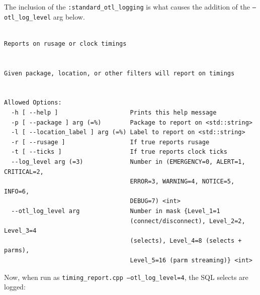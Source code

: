 \documentclass[11pt]{article}
\begin{document}
   The inclusion of the \texttt{:standard\_otl\_logging} is what causes the
   addition of the \texttt{--otl\_log\_level} arg below.


\lstset{language=Ruby}
\begin{lstlisting}

Reports on rusage or clock timings

 
Given package, location, or other filters will report on timings


Allowed Options:
  -h [ --help ]                    Prints this help message
  -p [ --package ] arg (=%)        Package to report on <std::string>
  -l [ --location_label ] arg (=%) Label to report on <std::string>
  -r [ --rusage ]                  If true reports rusage
  -t [ --ticks ]                   If true reports clock ticks
  --log_level arg (=3)             Number in (EMERGENCY=0, ALERT=1, CRITICAL=2,
                                   ERROR=3, WARNING=4, NOTICE=5, INFO=6, 
                                   DEBUG=7) <int>
  --otl_log_level arg              Number in mask {Level_1=1 
                                   (connect/disconnect), Level_2=2, Level_3=4 
                                   (selects), Level_4=8 (selects + parms), 
                                   Level_5=16 (parm streaming)} <int>
\end{lstlisting}



   Now, when run as \texttt{timing\_report.cpp --otl\_log\_level=4}, the SQL
   selects are logged:
\end{document}

